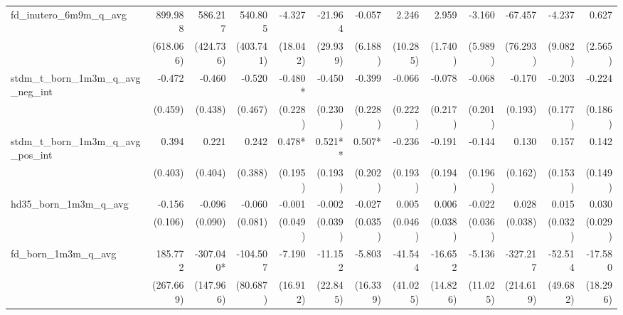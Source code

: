 \begin{tabular}{lrrrrrrrrrrrr}
fd\_inutero\_6m9m\_q\_avg                   &      899.988 &      586.217 &      540.805 &       -4.327 &      -21.964 &       -0.057 &        2.246 &        2.959 &       -3.160 &      -67.457 &       -4.237 &        0.627 \\ 
                                            &    (618.066) &    (424.736) &    (403.741) &     (18.042) &     (29.939) &      (6.188) &     (10.285) &      (1.740) &      (5.989) &     (76.293) &      (9.082) &      (2.565) \\ 
stdm\_t\_born\_1m3m\_q\_avg\_neg\_int       &       -0.472 &       -0.460 &       -0.520 &      -0.480* &       -0.450 &       -0.399 &       -0.066 &       -0.078 &       -0.068 &       -0.170 &       -0.203 &       -0.224 \\ 
                                            &      (0.459) &      (0.438) &      (0.467) &      (0.228) &      (0.230) &      (0.228) &      (0.222) &      (0.217) &      (0.201) &      (0.193) &      (0.177) &      (0.186) \\ 
stdm\_t\_born\_1m3m\_q\_avg\_pos\_int       &        0.394 &        0.221 &        0.242 &       0.478* &      0.521** &       0.507* &       -0.236 &       -0.191 &       -0.144 &        0.130 &        0.157 &        0.142 \\ 
                                            &      (0.403) &      (0.404) &      (0.388) &      (0.195) &      (0.193) &      (0.202) &      (0.193) &      (0.194) &      (0.196) &      (0.162) &      (0.153) &      (0.149) \\ 
hd35\_born\_1m3m\_q\_avg                    &       -0.156 &       -0.096 &       -0.060 &       -0.001 &       -0.002 &       -0.027 &        0.005 &        0.006 &       -0.022 &        0.028 &        0.015 &        0.030 \\ 
                                            &      (0.106) &      (0.090) &      (0.081) &      (0.049) &      (0.039) &      (0.035) &      (0.046) &      (0.038) &      (0.036) &      (0.038) &      (0.032) &      (0.029) \\ 
fd\_born\_1m3m\_q\_avg                      &      185.772 &    -307.040* &     -104.507 &       -7.190 &      -11.152 &       -5.803 &      -41.544 &      -16.652 &       -5.136 &     -327.217 &      -52.514 &      -17.580 \\ 
                                            &    (267.669) &    (147.966) &     (80.687) &     (16.912) &     (22.845) &     (16.339) &     (41.025) &     (14.826) &     (11.025) &    (214.619) &     (49.682) &     (18.296) \\ 

\end{tabular}
